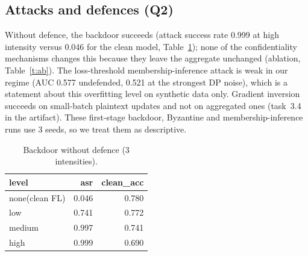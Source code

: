 \documentclass[conference]{IEEEtran}
\begin{document}
\subsection{Attacks and defences (Q2)}
Without defence, the backdoor succeeds (attack success rate 0.999 at high intensity versus 0.046 for the clean model, Table~\ref{t:bd}); none of the confidentiality mechanisms changes this because they leave the aggregate unchanged (ablation, Table~\ref{t:ab}). The loss-threshold membership-inference attack is weak in our regime (AUC 0.577 undefended, 0.521 at the strongest DP noise), which is a statement about this overfitting level on synthetic data only. Gradient inversion succeeds on small-batch plaintext updates and not on aggregated ones (task~3.4 in the artifact). These first-stage backdoor, Byzantine and membership-inference runs use 3 seeds, so we treat them as descriptive.
\begin{table}[t]\centering\caption{Backdoor without defence (3 intensities).}\label{t:bd}\scriptsize
\begin{tabular}{lrr}\toprule
level & asr & clean\_acc \\\midrule
none(clean FL) & 0.046 & 0.780 \\
low & 0.741 & 0.772 \\
medium & 0.997 & 0.741 \\
high & 0.999 & 0.690 \\\bottomrule\end{tabular}\end{table}
\begin{table}[t]\centering\caption{Ablation of security layers (measured; 10 seeds, randomised run order; training overhead with 95\% bootstrap interval, an interval that contains 0 means no measurable overhead).}\label{t:ab}\scriptsize
{}\end{table}
\end{document}
